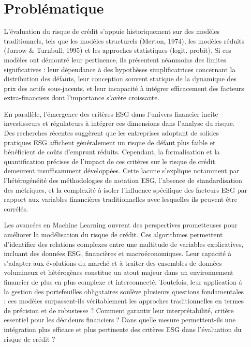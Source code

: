 \section{Problématique}

L'évaluation du risque de crédit s'appuie historiquement sur des modèles traditionnels, tels que les modèles structurels (Merton, 1974), les modèles réduits (Jarrow \& Turnbull, 1995) et les approches statistiques (logit, probit). Si ces modèles ont démontré leur pertinence, ils présentent néanmoins des limites significatives : leur dépendance à des hypothèses simplificatrices concernant la distribution des défauts, leur conception souvent statique de la dynamique des prix des actifs sous-jacents, et leur incapacité à intégrer efficacement des facteurs extra-financiers dont l'importance s'avère croissante.

En parallèle, l'émergence des critères ESG dans l'univers financier incite investisseurs et régulateurs à intégrer ces dimensions dans l'analyse du risque. Des recherches récentes suggèrent que les entreprises adoptant de solides pratiques ESG affichent généralement un risque de défaut plus faible et bénéficient de coûts d'emprunt réduits. Cependant, la formalisation et la quantification précises de l'impact de ces critères sur le risque de crédit demeurent insuffisamment développées. Cette lacune s'explique notamment par l'hétérogénéité des méthodologies de notation ESG, l'absence de standardisation des métriques, et la complexité à isoler l'influence spécifique des facteurs ESG par rapport aux variables financières traditionnelles avec lesquelles ils peuvent être corrélés.

Les avancées en Machine Learning ouvrent des perspectives prometteuses pour améliorer la modélisation du risque de crédit. Ces algorithmes permettent d'identifier des relations complexes entre une multitude de variables explicatives, incluant des données ESG, financières et macroéconomiques. Leur capacité à s'adapter aux évolutions du marché et à traiter des ensembles de données volumineux et hétérogènes constitue un atout majeur dans un environnement financier de plus en plus complexe et interconnecté. Toutefois, leur application à la gestion des portefeuilles obligataires soulève plusieurs questions fondamentales : ces modèles surpassent-ils véritablement les approches traditionnelles en termes de précision et de robustesse ? Comment garantir leur interprétabilité, critère essentiel pour les décideurs financiers ? Dans quelle mesure permettent-ils une intégration plus efficace et plus pertinente des critères ESG dans l'évaluation du risque de crédit ?

